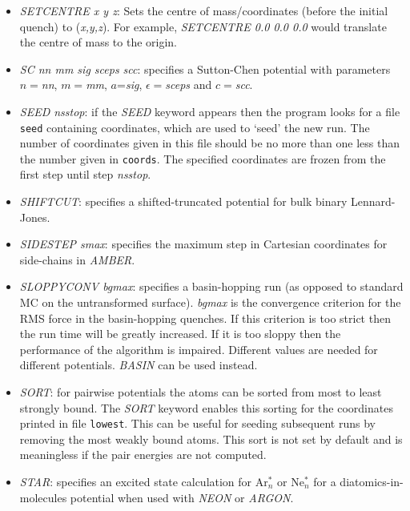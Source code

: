 \documentclass[12pt,a4paper,dvips]{article}
\begin{document}
\begin{itemize}
\item {\it SETCENTRE x y z\/}: Sets the centre of mass/coordinates (before the initial quench) to ({\it x,y,z\/}). For example, {\it SETCENTRE 0.0 0.0 0.0\/}
would translate the centre of mass to the origin.

\item {\it SC nn mm sig sceps scc\/}: specifies a Sutton-Chen potential\cite{suttonc90} with
parameters $n=${\it nn\/}, $m=${\it mm\/}, $a$={\it sig\/}, $\epsilon=${\it sceps\/} and 
$c=${\it scc\/}.

\item {\it SEED nsstop\/}: if the {\it SEED\/} keyword appears then the program
looks for a file {\tt seed} containing coordinates, which are used to `seed' the new run.
The number of coordinates given in this file should be no more than one less than the number
given in {\tt coords}. The specified coordinates are frozen from the first step until 
step {\it nsstop\/}.

\item {\it SHIFTCUT\/}: specifies a shifted-truncated potential for bulk binary Lennard-Jones.

\item {\it SIDESTEP smax\/}: specifies the maximum step in Cartesian coordinates for side-chains
in {\it AMBER\/}.

\item {\it SLOPPYCONV bgmax\/}: specifies a basin-hopping run (as opposed to standard MC
on the untransformed surface). {\it bgmax\/} is the convergence criterion
for the RMS force in the basin-hopping
quenches. If this criterion is too strict then the run time will be greatly increased.
If it is too sloppy then the performance of the algorithm is impaired. Different values
are needed for different potentials. {\it BASIN} can be used instead.

\item {\it SORT}: for pairwise potentials the atoms can be sorted from most to least
strongly bound. The {\it SORT} keyword enables this sorting for the coordinates printed
in file {\tt lowest}. This can be useful for seeding subsequent runs by removing the
most weakly bound atoms. This sort is not set by default and is meaningless if the
pair energies are not computed.

\item {\it STAR}: specifies an excited state calculation for Ar$^*_n$ or Ne$^*_n$ for
a diatomics-in-molecules potential when used with {\it NEON\/} or {\it ARGON\/}.


\end{itemize}
\end{document}
